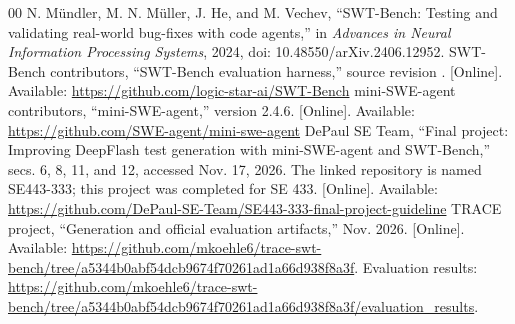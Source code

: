 \begin{thebibliography}{00}
 N. M\"undler, M. N. M\"uller, J. He, and M. Vechev, ``SWT-Bench: Testing and validating real-world bug-fixes with code agents,'' in \emph{Advances in Neural Information Processing Systems}, 2024, doi: 10.48550/arXiv.2406.12952.
 SWT-Bench contributors, ``SWT-Bench evaluation harness,'' source revision . [Online]. Available: \url{https://github.com/logic-star-ai/SWT-Bench}
 mini-SWE-agent contributors, ``mini-SWE-agent,'' version 2.4.6. [Online]. Available: \url{https://github.com/SWE-agent/mini-swe-agent}
 DePaul SE Team, ``Final project: Improving DeepFlash test generation with mini-SWE-agent and SWT-Bench,'' secs. 6, 8, 11, and 12, accessed Nov. 17, 2026. The linked repository is named SE443-333; this project was completed for SE 433. [Online]. Available: \url{https://github.com/DePaul-SE-Team/SE443-333-final-project-guideline}
 TRACE project, ``Generation and official evaluation artifacts,'' Nov. 2026. [Online]. Available: \url{https://github.com/mkoehle6/trace-swt-bench/tree/a5344b0abf54dcb9674f70261ad1a66d938f8a3f}. Evaluation results: \url{https://github.com/mkoehle6/trace-swt-bench/tree/a5344b0abf54dcb9674f70261ad1a66d938f8a3f/evaluation_results}.
\end{thebibliography}
